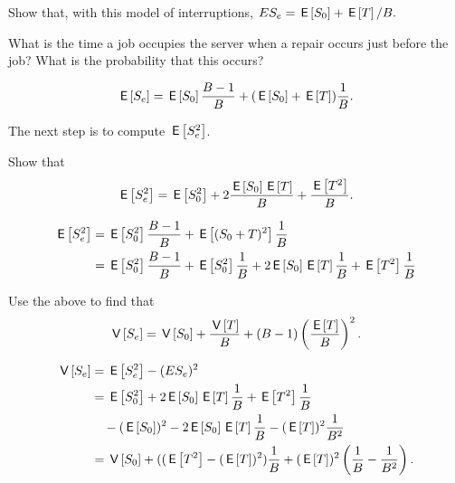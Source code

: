 \begin{exercise}
  Show that, with this model of interruptions, $E{S_e} = \E{S_0} + \E T/ B.$
  \begin{hint}
    What is the  time a job occupies the server when a repair occurs just before the job? What is the probability that this occurs?
  \end{hint}
  \begin{solution}
    \begin{equation*}
      \E{S_e} = \E{S_0} \frac{B-1}B + (\E{S_0} + \E T) \frac 1B.
    \end{equation*}
  \end{solution}
\end{exercise}




The next step is to compute $\E{S_e^2}$. 
\begin{exercise}
  Show that
  \begin{equation*}
    \E{S_e^2} = \E{S_0^2} + 2\frac{\E{S_0}\E{T}} B + \frac{\E{T^2}}B.
  \end{equation*}
  \begin{solution}
  \begin{equation*}
    \begin{split}
    \E{S_e^2} 
&= \E{S_0^2}\frac{B-1}B + \E{(S_0+T)^2}\frac 1B \\
&= \E{S_0^2}\frac{B-1}B + \E{S_0^2} \frac 1 B + 2 \E{S_0} \E T\frac 1B + \E{T^2}\frac 1B
    \end{split}
  \end{equation*}
  \end{solution}
\end{exercise}

\begin{exercise}
  Use the above to find that
  \begin{equation*}
    \V{S_e} = \V{S_0} + \frac{\V{T}} B + (B-1)\left(\frac{\E T}{B}\right)^2.
  \end{equation*}
  \begin{solution}
    \begin{equation*}
      \begin{split}
\V{S_e} 
&=\E{S_e^2} - (E{S_e})^2 \\
&= \E{S_0^2} + 2 \E{S_0} \E T\frac 1B + \E{T^2}\frac 1B  \\
&\quad - (\E{S_0})^2 - 2\E{S_0}\E T \frac 1 B - (\E T)^2\frac1{B^2}\\
&=  \V{S_0} + ((\E{T^2} - (\E T)^2)\frac 1 B + (\E T)^2\left(\frac 1B - \frac 1{B^2}\right).
      \end{split}
    \end{equation*}
  \end{solution}
\end{exercise}


